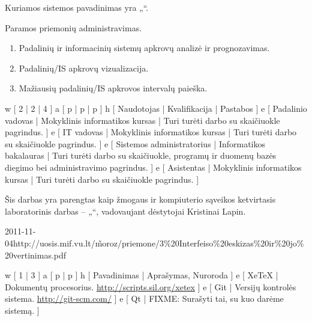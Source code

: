Kuriamos sistemos pavadinimas yra „\systemname“.

Paramos priemonių administravimas.

\begin{enumerate}
  \item Padalinių ir informacinių sistemų apkrovų analizė ir prognozavimas.
  \item Padalinių/IS apkrovų vizualizacija.
  \item Mažiausių padalinių/IS apkrovos intervalų paieška.
\end{enumerate}

\xtable
{
  w [ 2 | 2 | 4 ]
  a [ p | p | p ]
  h [ Naudotojas | Kvalifikacija | Pastabos ]
  e [ Padalinio vadovas | Mokyklinis informatikos kursas
  | Turi turėti darbo su skaičiuokle pagrindus.
  ]
  e [ IT vadovas | Mokyklinis informatikos kursas
  | Turi turėti darbo su skaičiuokle pagrindus.
  ]
  e [ Sistemos administratorius | Informatikos bakalauras
  | Turi turėti darbo su skaičiuokle, programų ir duomenų bazės diegimo
  bei administravimo pagrindus.
  ]
  e [ Asistentas | Mokyklinis informatikos kursas
  | Turi turėti darbo su skaičiuokle pagrindus.
  ]
}

Šis darbas yra parengtas kaip žmogaus ir kompiuterio sąveikos
ketvirtasis laboratorinis darbas – „\docname“, vadovaujant
dėstytojai Kristinai Lapin.

\xdoclist
{
  {2011-11-04}{http://uosis.mif.vu.lt/\~moroz/priemone/3\%20Interfeiso\%20eskizas\%20ir\%20jo\%20vertinimas.pdf}
}

\xtableu
{
  w [ 1 | 3 ]
  a [ p | p ]
  h [ Pavadinimas | Aprašymas, Nuroroda ]
  e [ XeTeX | Dokumentų procesorius. \newline \url{http://scripts.sil.org/xetex} ]
  e [ Git | Versijų kontrolės sistema. \newline \url{http://git-scm.com/} ]
  e [ Qt | FIXME: Surašyti tai, su kuo darėme sistemą. ]
}
